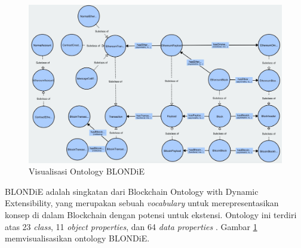 \begin{figure}[ht]
	\centering
	\includegraphics[width=1\textwidth]{resources/chapter-2/blondie-visualization.jpg}
	\caption{Visualisasi Ontology BLONDiE \parencite{third2017linked}}
	\label{image:blondie-visualization}
\end{figure}

BLONDiE adalah singkatan dari Blockchain Ontology with Dynamic Extensibility, yang merupakan sebuah \textit{vocabulary} untuk merepresentasikan konsep di dalam Blockchain dengan potensi untuk ekstensi. Ontology ini terdiri atas 23 \textit{class}, 11 \textit{object properties}, dan 64 \textit{data properties} \parencite{hector2020blondie}. Gambar \ref{image:blondie-visualization} memvisualisasikan ontology BLONDiE.